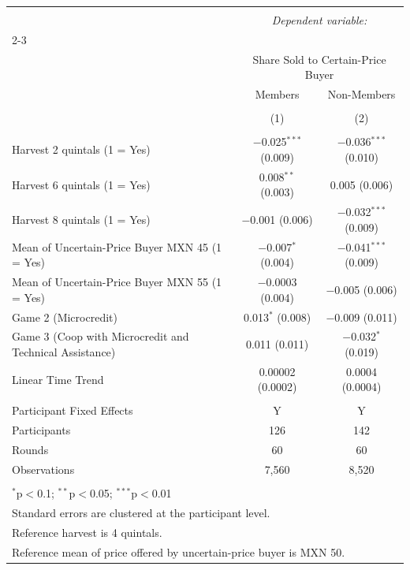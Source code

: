 
\begin{table}[!htbp] \centering 
   
   
\begin{tabular}{@{\extracolsep{5pt}}lcc} 
\\[-1.8ex]\hline 
\hline \\[-1.8ex] 
 & \multicolumn{2}{c}{\textit{Dependent variable:}} \\ 
\cline{2-3} 
\\[-1.8ex] & \multicolumn{2}{c}{Share Sold to Certain-Price Buyer} \\ 
 & Members & Non-Members \\ 
\\[-1.8ex] & (1) & (2)\\ 
\hline \\[-1.8ex] 
 Harvest 2 quintals (1 = Yes) & $-$0.025$^{***}$ (0.009) & $-$0.036$^{***}$ (0.010) \\ 
  Harvest 6 quintals (1 = Yes) & 0.008$^{**}$ (0.003) & 0.005 (0.006) \\ 
  Harvest 8 quintals (1 = Yes) & $-$0.001 (0.006) & $-$0.032$^{***}$ (0.009) \\ 
  Mean of Uncertain-Price Buyer MXN 45 (1 = Yes) & $-$0.007$^{*}$ (0.004) & $-$0.041$^{***}$ (0.009) \\ 
  Mean of Uncertain-Price Buyer MXN 55 (1 = Yes) & $-$0.0003 (0.004) & $-$0.005 (0.006) \\ 
  Game 2 (Microcredit) & 0.013$^{*}$ (0.008) & $-$0.009 (0.011) \\ 
  Game 3 (Coop with Microcredit and Technical Assistance) & 0.011 (0.011) & $-$0.032$^{*}$ (0.019) \\ 
  Linear Time Trend & 0.00002 (0.0002) & 0.0004 (0.0004) \\ 
 \hline \\[-1.8ex] 
Participant Fixed Effects & Y & Y \\ 
Participants & 126 & 142 \\ 
Rounds & 60 & 60 \\ 
Observations & 7,560 & 8,520 \\ 
\hline 
\hline \\[-1.8ex] 
\multicolumn{3}{l}{$^{*}$p$<$0.1; $^{**}$p$<$0.05; $^{***}$p$<$0.01} \\ 
\multicolumn{3}{l}{Standard errors are clustered at the participant level.} \\ 
\multicolumn{3}{l}{Reference harvest is 4 quintals.} \\ 
\multicolumn{3}{l}{Reference mean of price offered by uncertain-price buyer is MXN 50.} \\ 
\end{tabular} 
\end{table} 
